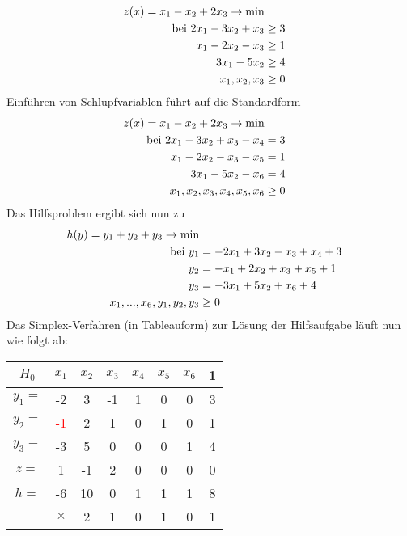 \begin{example}
	\begin{align}
		z(x) = x_1 - x_2 + 2x_3\to\min \notag \\
		\text{bei } 2x_1 - 3x_2 + x_3 &\ge 3 \notag \\
		x_1 - 2x_2 - x_3 &\ge 1 \notag \\
		3x_1 - 5x_2 &\ge 4 \notag \\
		x_1,x_2,x_3&\ge 0\notag
	\end{align}
	Einführen von Schlupfvariablen führt auf die Standardform
	\begin{align}
		z(x) = x_1 - x_2 + 2x_3\to\min \notag \\
		\text{bei } 2x_1 - 3x_2 + x_3 - x_4 &= 3 \notag \\
		x_1 - 2x_2 - x_3 - x_5 &= 1 \notag \\
		3x_1 - 5x_2  - x_6 &= 4 \notag \\
		x_1,x_2,x_3,x_4,x_5,x_6&\ge 0\notag
	\end{align}
	Das Hilfsproblem ergibt sich nun zu
	\begin{align}
		h(y) = y_1+y_2+y_3 \to\min \notag \\
		\text{bei } y_1 &= -2x_1 + 3x_2 - x_3 + x_4 + 3 \notag \\
		y_2 &= -x_1 + 2x_2 + x_3 + x_5 + 1 \notag \\
		y_3 &= -3x_1 + 5x_2  + x_6 + 4 \notag \\
		x_1,...,x_6,y_1,y_2,y_3&\ge 0\notag
	\end{align}
	Das Simplex-Verfahren (in Tableauform) zur Lösung der Hilfsaufgabe läuft nun wie folgt ab:
	\begin{minipage}[c]{0.5\textwidth}
		\begin{center}
			\begin{tabular}{c|cccccc|c}
				$H_0$ & $x_1$ & $x_2$ & $x_3$ & $x_4$ & $x_5$ & $x_6$ & 1 \\
				\hline
				$y_1 = $ & -2 & 3 & -1 & 1 & 0 & 0 & 3 \\
				$y_2 = $ & \textcolor{red}{-1} & 2 & 1 & 0 & 1 & 0 & 1 \\
				$y_3 = $ & -3 & 5 & 0 & 0 & 0 & 1 & 4 \\
				\hline
				$z = $ & 1 & -1 & 2 & 0 & 0 & 0 & 0 \\
				\hline
				$h= $ & -6 & 10 & 0 & 1 & 1 & 1 & 8 \\
				\hline 
				& $\times$ & 2 & 1 & 0 & 1 & 0 & 1 \\
			\end{tabular}

\end{center}
\end{minipage}
\end{example}
